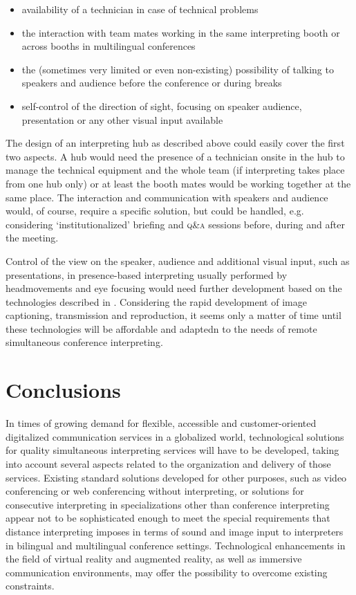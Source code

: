 \documentclass[output=paper]{langsci/langscibook}
\begin{document}
\begin{itemize}
\item availability of a technician in case of technical problems
\item the interaction with team mates working in the same interpreting booth or across booths in multilingual conferences
\item the (sometimes very limited or even non-existing) possibility of talking to speakers and audience before the conference or during breaks
\item self-control of the direction of sight, focusing on speaker audience, presentation or any other visual input available
\end{itemize}


The design of an interpreting hub as described above could easily cover the first two aspects. A hub would need the presence of a technician onsite in the hub to manage the technical equipment and the whole team (if interpreting takes place from one hub only) or at least the booth mates would be working together at the same place. 
The interaction and communication with speakers and audience would, of course, require a specific solution, but could be handled, e.g. considering ‘institutionalized’ briefing and \textsc{q\&a} sessions before, during and after the meeting.

Control of the view on the speaker, audience and additional visual input, such as presentations, in presence-based interpreting usually performed by head\linebreak movements and eye focusing would need further development based on the technologies described in . Considering the rapid development of image captioning, transmission and reproduction, it seems only a matter of time until these technologies will be affordable and adaptedn to the needs of remote simultaneous conference interpreting. 

\section{Conclusions}
\label{sec:ziegler:07}
In times of growing demand for flexible, accessible and customer-oriented digitalized communication services in a globalized world, technological solutions for quality simultaneous interpreting services will have to be developed, taking into account several aspects related to the organization and delivery of those services. Existing standard solutions developed for other purposes, such as video conferencing or web conferencing without interpreting, or solutions for consecutive interpreting in specializations other than conference interpreting appear not to be sophisticated enough to meet the special requirements that distance interpreting imposes in terms of sound and image input to interpreters in bilingual and multilingual conference settings. Technological enhancements in the field of virtual reality and augmented reality, as well as immersive communication environments, may offer the possibility to overcome existing constraints.
\end{document}
